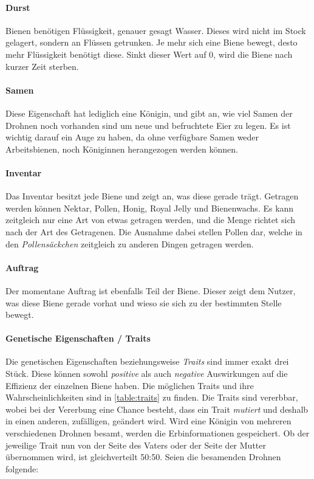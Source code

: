 \paragraph{Durst} 
Bienen benötigen Flüssigkeit, genauer gesagt Wasser. Dieses wird nicht im Stock gelagert, sondern an Flüssen getrunken. Je mehr sich eine Biene bewegt, desto mehr Flüssigkeit benötigt diese. Sinkt dieser Wert auf 0, wird die Biene nach kurzer Zeit sterben.

\paragraph{Samen} 
Diese Eigenschaft hat lediglich eine Königin, und gibt an, wie viel Samen der Drohnen noch vorhanden sind um neue und befruchtete Eier zu legen. Es ist wichtig darauf ein Auge zu haben, da ohne verfügbare Samen weder Arbeitsbienen, noch Königinnen herangezogen werden können.

\paragraph{Inventar} 
Das Inventar besitzt jede Biene und zeigt an, was diese gerade trägt. Getragen werden können Nektar, Pollen, Honig, Royal Jelly und Bienenwachs. Es kann zeitgleich nur eine Art von etwas getragen werden, und die Menge richtet sich nach der Art des Getragenen. Die Ausnahme dabei stellen Pollen dar, welche in den \textit{Pollensäckchen} zeitgleich zu anderen Dingen getragen werden.

\paragraph{Auftrag} 
Der momentane Auftrag ist ebenfalls Teil der Biene. Dieser zeigt dem Nutzer, was diese Biene gerade vorhat und wieso sie sich zu der bestimmten Stelle bewegt.

\paragraph{Genetische Eigenschaften / Traits} 
Die genetischen Eigenschaften beziehungsweise \textit{Traits} sind immer exakt drei Stück. Diese können sowohl \textit{positive} als auch \textit{negative} Auswirkungen auf die Effizienz der einzelnen Biene haben. Die möglichen Traits und ihre Wahrscheinlichkeiten sind in \autoref{table:traits} zu finden. Die Traits sind vererbbar, wobei bei der Vererbung eine Chance besteht, dass ein Trait \textit{mutiert} und deshalb in einen anderen, zufälligen, geändert wird. Wird eine Königin von mehreren verschiedenen Drohnen besamt, werden die Erbinformationen gespeichert. Ob der jeweilige Trait nun von der Seite des Vaters oder der Seite der Mutter übernommen wird, ist gleichverteilt 50:50. Seien die besamenden Drohnen folgende:

